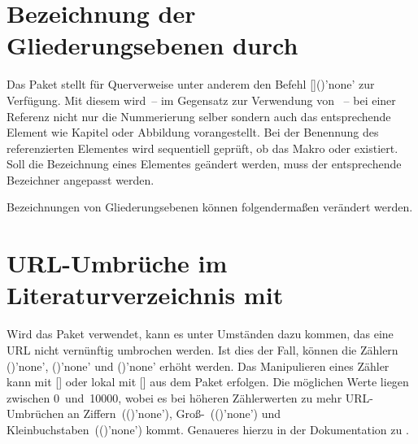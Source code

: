 \section{Bezeichnung der Gliederungsebenen durch }
%
%
Das Paket  stellt für Querverweise unter anderem den Befehl 
[]()'none' zur Verfügung. Mit 
diesem wird~-- im Gegensatz zur Verwendung von ~-- bei einer 
Referenz nicht nur die Nummerierung selber sondern auch das entsprechende 
Element wie Kapitel oder Abbildung vorangestellt. Bei der Benennung des 
referenzierten Elementes wird sequentiell geprüft, ob das Makro 
 oder 
 existiert. Soll die Bezeichnung eines 
Elementes geändert werden, muss der entsprechende Bezeichner angepasst werden.
%
\begin{Example}
Bezeichnungen von Gliederungsebenen können folgendermaßen verändert werden.
\begin{Code}
\end{Code}
\end{Example}



\section{URL-Umbrüche im Literaturverzeichnis mit }
%
%
Wird das Paket  verwendet, kann es unter Umständen dazu 
kommen, das eine URL nicht vernünftig umbrochen werden. Ist dies der Fall, 
können die Zählern ()'none', 
()'none' und 
()'none' erhöht werden. Das 
Manipulieren eines Zähler kann mit [] oder 
lokal mit [] aus dem Paket 
 erfolgen. Die möglichen Werte liegen zwischen 0~und~10000, 
wobei es bei höheren Zählerwerten zu mehr URL-Umbrüchen an 
Ziffern~(()'none'), 
Groß-~(()'none') und 
Kleinbuchstaben~(()'none') kommt. 
Genaueres hierzu in der Dokumentation zu .



